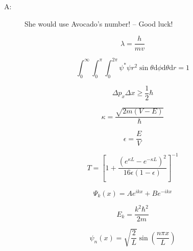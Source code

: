 \documentclass[12pt, letterpaper]{memoir}
\begin{document}
\begin{center}
		\begin{description}
			\item[A:] She would use Avocado's number! -- Good luck!
		\end{description}
		
				
	\end{center}
	
	\newpage

		\begin{minipage}{0.495\textwidth}			
			\begin{equation*}
			\lambda=\frac{h}{mv}
			\end{equation*}
			
			\begin{equation*}
			\displaystyle\int_{0}^{\infty}\displaystyle\int_{0}^{\pi}\displaystyle\int_{0}^{2\pi}\psi^{*}\psi r^2\sin\theta\mathrm{d}\phi\mathrm{d}\theta\mathrm{d}r=1
			\end{equation*}			

			
			\begin{equation*}
			\Delta p_x\Delta x \geq \frac{1}{2}\hbar
			\end{equation*}
		
			\begin{equation*}
			\kappa = \dfrac{\sqrt{2m(V-E)}}{\hbar}
			\end{equation*}
		
			\begin{equation*}
			\epsilon = \dfrac{E}{V}
			\end{equation*}
		
			\begin{equation*}
			T=\left[1+\frac{\left(e^{\kappa L} - e^{-\kappa L}\right)^2}{16\epsilon(1-\epsilon)}\right]^{-1}
			\end{equation*}
			
			\begin{equation*}
				\Psi_k(x) = Ae^{ikx} + Be^{-ikx}	
			\end{equation*}
			
			\begin{equation*}
				E_k = \frac{k^2\hbar^2}{2m}
			\end{equation*}
			
			\begin{equation*}
			\psi_n(x) = \sqrt{\dfrac{2}{L}}\sin\left(\dfrac{n\pi x}{L}\right)
			\end{equation*}			
		
		
		\end{minipage}
\end{document}
